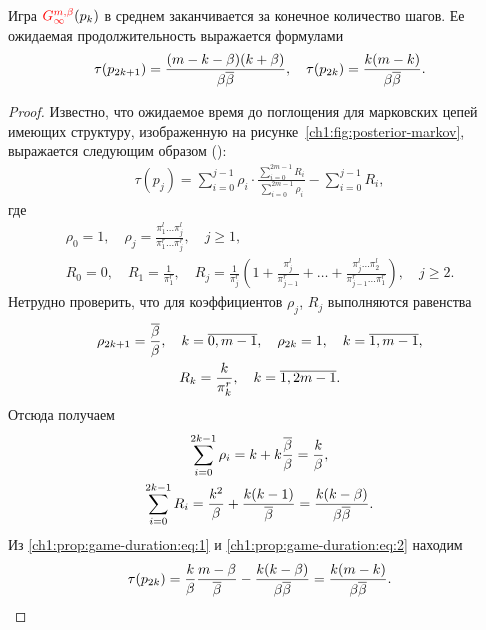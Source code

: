 {\begin{proposition}
  \label{ch1:prop:game-duration}
  Игра $\theG*{\infty}(p_k)$ в среднем заканчивается за конечное количество шагов.
  Ее ожидаемая продолжительность выражается формулами
  \begin{equation*} 
    \tau(p_{2k+1}) = \frac{(m-k-\beta)(k+\beta)}{\beta {{\overline{\beta}}}},\quad
    \tau(p_{2k}) = \frac{k(m-k)}{\beta {{\overline{\beta}}}}.
  \end{equation*}
\end{proposition}
\begin{proof}
  Известно, что ожидаемое время до поглощения для марковских цепей имеющих структуру, изображенную на рисунке~\ref{ch1:fig:posterior-markov}, выражается следующим образом (\seename \cite[\S~12]{shiryaev11}):
  \begin{gather}
    \label{ch1:prop:game-duration:eq:1}
    \tau(p_j) =
    \sum_{i=0}^{j-1} \rho_i \cdot
    \frac{\sum_{i=0}^{2m-1} R_i}{\sum_{i=0}^{2m-1} \rho_i} -
    \sum_{i=0}^{j-1} R_i,
  \end{gather}
  где
  \begin{gather*}
  \rho_0 = 1, \quad
    \rho_j = \frac{\pi^l_1 \ldots \pi^l_j}{\pi^r_1 \ldots \pi^r_j}, \quad j \geq 1,\\
    R_0 = 0, \quad
    R_1 = \frac{1}{\pi^r_1}, \quad
    R_j = \frac{1}{\pi^r_j}\left( 
      1 + 
      \frac{\pi^l_j}{\pi^r_{j-1}} + 
      \ldots + \frac{\pi^l_j \ldots \pi^l_2}{\pi^r_{j-1} \ldots \pi^r_1}
    \right), \quad j \geq 2.
  \end{gather*}
  Нетрудно проверить, что для коэффициентов $\rho_j$, $R_j$ выполняются равенства
  \begin{gather*}
    \rho_{2k+1} = \frac{{{\overline{\beta}}}}{\beta},\quad k = \overline{0, m-1},\quad
    \rho_{2k} = 1,\quad k = \overline{1, m-1},\\
    R_k = \frac{k}{\pi^r_k},\quad k = \overline{1, 2m-1}.
  \end{gather*}
  Отсюда получаем
  \begin{equation}
    \label{ch1:prop:game-duration:eq:2}
    \begin{gathered}
      \sum_{i=0}^{2k-1} \rho_i = k + k \frac{{{\overline{\beta}}}}{\beta} = \frac{k}{\beta},\\
      \sum_{i=0}^{2k-1} R_i = \frac{k^2}{\beta} + \frac{k(k-1)}{{{\overline{\beta}}}} = \frac{k(k-\beta)}{\beta{{\overline{\beta}}}}.
    \end{gathered}
  \end{equation}
  Из \eqref{ch1:prop:game-duration:eq:1} и \eqref{ch1:prop:game-duration:eq:2} находим
  \begin{gather}
    \label{ch1:prop:game-duration:eq3}
    \tau(p_{2k}) =
    \frac{k}{\beta} \frac{m-\beta}{{{\overline{\beta}}}} - \frac{k(k-\beta)}{\beta{{\overline{\beta}}}} =
    \frac{k(m-k)}{\beta{{\overline{\beta}}}}.
  \end{gather}


\end{proof}}
